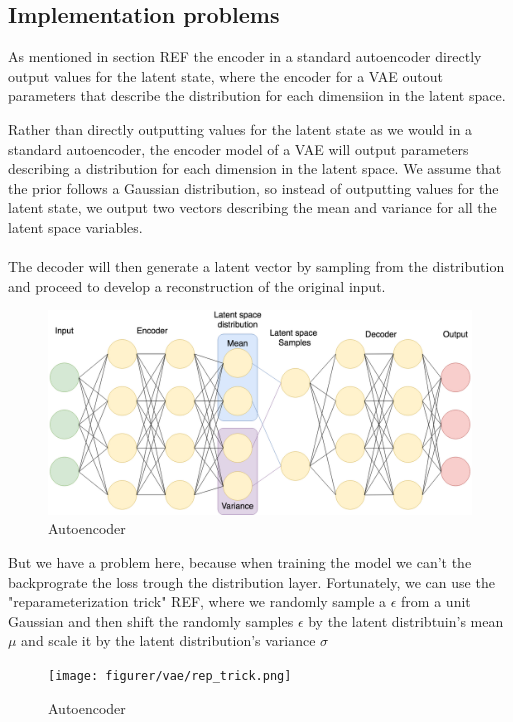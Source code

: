 \documentclass[11pt]{article}
\begin{document}
\subsection{Implementation problems}

As mentioned in section REF the encoder in a standard autoencoder directly output values for the latent state, where the encoder for a VAE outout parameters that describe the distribution for each dimensiion in the latent space. 


Rather than directly outputting values for the latent state as we would in a standard autoencoder, the encoder model of a VAE will output parameters describing a distribution for each dimension in the latent space. We assume that the prior follows a Gaussian distribution, so instead of outputting values for the latent state, we output two vectors describing the mean and variance for all the latent space variables. 
\\ \\
The decoder will then generate a latent vector by sampling from the distribution and proceed to develop a reconstruction of the original input.

\begin{figure}[!h]
    \centering
    \includegraphics[scale=0.35]{figurer/vae/vae_network.png}
    \caption{Autoencoder}
    \label{fig:vae}
\end{figure}

But we have a problem here, because when training the model we can't the backprograte the loss trough the distribution layer. Fortunately, we can use the "reparameterization trick" REF, where we randomly sample a $\epsilon$ from a unit Gaussian and then shift the randomly samples $\epsilon$ by the latent distribtuin's mean $\mu$ and scale it by the latent distribution's variance $\sigma$

\begin{figure}[!h]
    \centering
    \texttt{[image: figurer/vae/rep\_trick.png]}
    \caption{Autoencoder}
    \label{fig:vae}
\end{figure}



    
\end{document}
